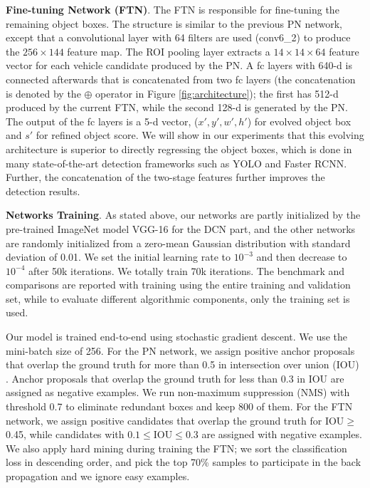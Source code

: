 \documentclass[5pt]{article}
\begin{document}
\vspace{0.08in}
\noindent\textbf{Fine-tuning Network (FTN)}. The FTN is responsible for fine-tuning the remaining object boxes. The structure is similar to the previous PN network, except that a convolutional layer with 64 filters are used (conv6\_2) to produce the $256\times144$ feature map. The ROI pooling layer extracts a $14\times14\times64$ feature vector for each vehicle candidate produced by the PN. A fc layers with 640-d is connected afterwards that is concatenated from two fc layers (the concatenation is denoted by the $\oplus$ operator in Figure \ref{fig:architecture}); the first has 512-d produced by the current FTN, while the second 128-d is generated by the PN. The output of the fc layers is a 5-d vector, ($x', y', w', h'$) for evolved object box and $s'$ for refined object score. We will show in our experiments that this evolving architecture is superior to directly regressing the object boxes, which is done in many state-of-the-art detection frameworks such as YOLO and Faster RCNN. Further, the concatenation of the two-stage features further improves the detection results.

\vspace{0.08in}
\noindent\textbf{Networks Training}.
As stated above, our networks are partly initialized by the pre-trained ImageNet model VGG-16 \cite{simonyan2014very} for the DCN part, and the other networks are randomly initialized from a zero-mean Gaussian distribution with standard deviation of 0.01. We set the initial learning rate to $10^{-3}$ and then decrease to $10^{-4}$ after 50k iterations. We totally train 70k iterations. The benchmark and comparisons are reported with training using the entire training and validation set, while to evaluate different algorithmic components, only the training set is used.

Our model is trained end-to-end using stochastic gradient descent. We use the mini-batch size of 256. For the PN network, we assign positive anchor proposals that overlap the ground truth for more than 0.5 in intersection over union (IOU) \cite{felzenszwalb2010object}. Anchor proposals that overlap the ground truth for less than 0.3 in IOU are assigned as negative examples. We run non-maximum suppression (NMS) \cite{felzenszwalb2010object} with threshold 0.7 to eliminate redundant boxes and keep 800 of them. For the FTN network, we assign positive candidates that overlap the ground truth for IOU$\ge$0.45, while candidates with $0.1\le$IOU$\le$0.3 are assigned with negative examples. We also apply hard mining \cite{felzenszwalb2010object} during training the FTN; we sort the classification loss in descending order, and pick the top 70\% samples to participate in the back propagation and we ignore easy examples.
\end{document}
